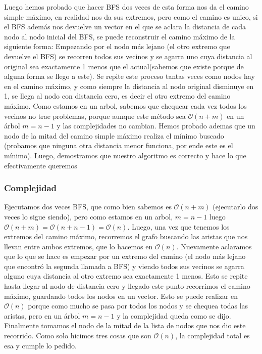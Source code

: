\documentclass[A4paper,oneside,fleqn,11pt]{article}
\theoremstyle{definition}
\begin{document}
Luego hemos probado que hacer BFS dos veces de esta forma nos da el camino simple máximo, en realidad nos da sus extremos, pero como el camino es unico, si el BFS además nos devuelve un vector en el que se aclara la distancia de cada nodo al nodo inicial del BFS, se puede reconstruir el camino máximo de la siguiente forma: Empezando por el nodo más lejano (el otro extremo que devuelve el BFS) se recorren todos sus vecinos y se agarra uno cuya distancia al original sea exactamente 1 menos que el actual(sabemos que existe porque de alguna forma se llego a este). Se repite este proceso tantas veces como nodos hay en el camino máximo, y como siempre la distancia al nodo original disminuye en 1, se llega al nodo con distancia cero, es decir el otro extremo del camino máximo. Como estamos en un arbol, sabemos que chequear cada vez todos los vecinos no trae problemas, porque aunque este método sea $\mathcal{O} (n+m)$ en un árbol $m=n-1$ y las complejidades no cambian. Hemos probado ademas que un nodo de la mitad del camino simple máximo realiza el mínimo buscado (probamos que ninguna otra distancia menor funciona, por ende este es el mínimo). Luego, demostramos que nuestro algoritmo es correcto y hace lo que efectivamente queremos

\subsubsection{Complejidad}

Ejecutamos dos veces BFS, que como bien sabemos es $\mathcal{O} (n+m)$ (ejecutarlo dos veces lo sigue siendo), pero como estamos en un arbol, $m=n-1$ luego $\mathcal{O} (n+m) =\mathcal{O} (n+n-1)=\mathcal{O} (n)$. Luego, una vez que tenemos los extremos del camino máximo, recorremos el grafo buscando las aristas que nos llevan entre ambos extremos, que lo hacemos en $\mathcal{O} (n)$. Nuevamente aclaramos que lo que se hace es empezar por un extremo del camino (el nodo más lejano que encontró la segunda llamada a BFS) y viendo todos sus vecinos se agarra alguno cuya distancia al otro extremo sea exactamente 1 menos. Esto se repite hasta llegar al nodo de distancia cero y llegado este punto recorrimos el camino máximo, guardando todos los nodos en un vector. Esto se puede realizar en $\mathcal{O} (n)$ porque como mucho se pasa por todos los nodos y se chequea todas las aristas, pero en un árbol $m=n-1$ y la complejidad queda como se dijo. Finalmente tomamos el nodo de la mitad de la lista de nodos que nos dio este recorrido. Como solo hicimos tres cosas que son $\mathcal{O} (n)$, la complejidad total es esa y cumple lo pedido.
\end{document}
